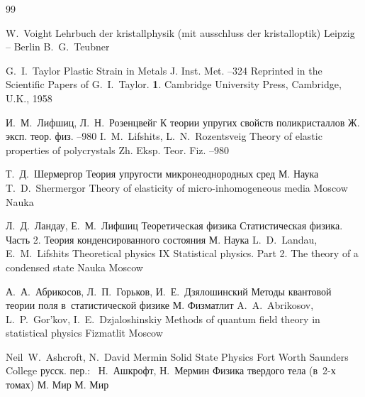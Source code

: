\begin{thebibliography}{99}

\by W.~Voight
\book Lehrbuch der kristallphysik (mit ausschluss der kristalloptik)
\publaddr Leipzig -- Berlin
\publ B.~G.~Teubner

\by G.~I.~Taylor
\paper Plastic Strain in Metals
\jour J. Inst. Met.
--324
\miscnote Reprinted in the Scientific Papers of G.~I.~Taylor. {\bf 1}. Cambridge University Press, 
Cambridge, U.K., 1958


\by И.~М.~Лифшиц, Л.~Н.~Розенцвейг
\paper К теории упругих свойств поликристаллов
\jour Ж. эксп. теор. физ.
--980
\misctransl
\by I.~M.~Lifshits, L.~N.~Rozentsveig
\paper Theory of elastic properties of polycrystals
\jour Zh. Eksp. Teor. Fiz.
--980

\by Т.~Д.~Шермергор
\book Теория упругости микронеоднородных сред
\publaddr М.
\publ Наука
\misctransl
\by T.~D.~Shermergor  
\book Theory of elasticity of micro-inhomogeneous media
\publaddr Moscow
\publ Nauka

\by Л.~Д.~Ландау, Е.~М.~Лифшиц
\book  Теоретическая физика
\volinfo Статистическая физика. Часть 2. Теория конденсированного состояния
\publaddr М.
\publ Наука
\misctransl
\by L.~D.~Landau, \by E.~M.~Lifshits
\book Theoretical physics
\bookvol IX
\volinfo Statistical physics. Part 2. The theory of a condensed state
\publ Nauka
\publaddr Moscow



\by А.~А.~Абрикосов, Л.~П.~Горьков, И.~Е.~Дзялошинский
\book Методы квантовой теории поля в~статистической физике
\publaddr М.
\publ Физматлит
\misctransl
\by A.~A.~Abrikosov,  L.~P.~Gor'kov, I.~E.~Dzjaloshinskiy 
\book Methods of quantum field theory in statistical physics
\publ Fizmatlit
\publaddr Moscow

\by Neil~W.~Ashcroft, N.~David Mermin 
\book Solid State Physics
\publaddr Fort Worth 
\publ Saunders College 
\rtransl русск. пер.:~
\by Н.~Ашкрофт, Н.~Мермин
\book Физика твердого тела (в~2-х томах)
\publaddr М.
\publ Мир
\morerref
{}
\publaddr М.
\publ Мир


\end{thebibliography}
